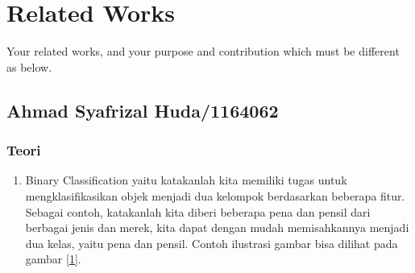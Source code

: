 \chapter{Related Works}

Your related works, and your purpose and contribution which must be different as below.

\section{Ahmad Syafrizal Huda/1164062}
\subsection{Teori}
\begin{enumerate}
\item Binary Classification yaitu katakanlah kita memiliki tugas untuk mengklasifikasikan objek menjadi dua kelompok berdasarkan beberapa fitur. Sebagai contoh, katakanlah kita diberi beberapa pena dan pensil dari berbagai jenis dan merek, kita dapat dengan mudah memisahkannya menjadi dua kelas, yaitu pena dan pensil.
\subitem Contoh ilustrasi gambar bisa dilihat pada gambar \ref{1}.


\end{enumerate}
